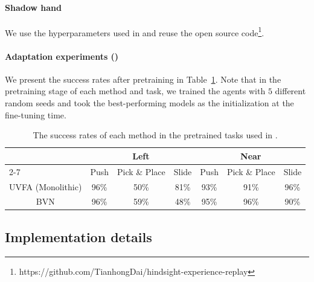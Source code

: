 \documentclass[dvipsnames]{article} %
\theoremstyle{definition}
\theoremstyle{remark}
\begin{document}
\paragraph{Shadow hand} We use the hyperparameters used in \citep{plappert2018multi} and reuse the open source code\footnote{https://github.com/TianhongDai/hindsight-experience-replay}.

\paragraph{Adaptation experiments ()} We present the success rates after pretraining in Table~\ref{tab:pretrain_perf}. Note that in the pretraining stage of each method and task, we trained the agents with $5$ different random seeds and took the best-performing models as the initialization at the fine-tuning time.
\begin{table}[]
\caption{The success rates of each method in the pretrained tasks used in .}\label{tab:pretrain_perf}
\centering
\begin{tabular}{lccc|ccc}
\toprule
\multirow{2}{*}{}                      & \multicolumn{3}{c|}{Left}                                                                 & \multicolumn{3}{c}{Near}                                                                 \\
\cmidrule{2-7}
                                       & \multicolumn{1}{l}{Push} & \multicolumn{1}{l}{Pick \& Place} & \multicolumn{1}{l|}{Slide} & \multicolumn{1}{l}{Push} & \multicolumn{1}{l}{Pick \& Place} & \multicolumn{1}{l}{Slide} \\ 
\midrule
\multicolumn{1}{c}{UVFA (Monolithic)} & 96\%                     & 50\%                              & 81\%                       & 93\%                     & 91\%                              & 96\%                      \\
\multicolumn{1}{c}{BVN}               & 96\%                     & 59\%                              & 48\%                       & 95\%                     & 96\%                              & 90\%                      \\
\bottomrule
\end{tabular}
\end{table}

\subsection{Implementation details}
\label{subsec:impl_detail}
\end{document}
